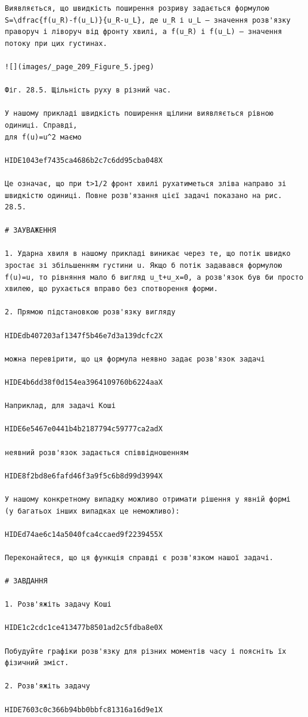 \documentclass[
  ukrainian,
]{article}
\begin{document}
\begin{verbatim}
Виявляється, що швидкість поширення розриву задається формулою
S=\dfrac{f(u_R)-f(u_L)}{u_R-u_L}, де u_R і u_L — значення розв'язку праворуч і ліворуч від фронту хвилі, а f(u_R) і f(u_L) — значення потоку при цих густинах.

![](images/_page_209_Figure_5.jpeg)

Фіг. 28.5. Щільність руху в різний час.

У нашому прикладі швидкість поширення щілини виявляється рівною одиниці. Справді,
для f(u)=u^2 маємо

HIDE1043ef7435ca4686b2c7c6dd95cba048X

Це означає, що при t>1/2 фронт хвилі рухатиметься зліва направо зі швидкістю одиниці. Повне розв'язання цієї задачі показано на рис. 28.5.

# ЗАУВАЖЕННЯ

1. Ударна хвиля в нашому прикладі виникає через те, що потік швидко зростає зі збільшенням густини u. Якщо б потік задавався формулою f(u)=u, то рівняння мало б вигляд u_t+u_x=0, а розв'язок був би просто хвилею, що рухається вправо без спотворення форми.

2. Прямою підстановкою розв'язку вигляду

HIDEdb407203af1347f5b46e7d3a139dcfc2X

можна перевірити, що ця формула неявно задає розв'язок задачі

HIDE4b6dd38f0d154ea3964109760b6224aaX

Наприклад, для задачі Коші

HIDE6e5467e0441b4b2187794c59777ca2adX

неявний розв'язок задається співвідношенням

HIDE8f2bd8e6fafd46f3a9f5c6b8d99d3994X

У нашому конкретному випадку можливо отримати рішення у явній формі
(у багатьох інших випадках це неможливо):

HIDEd74ae6c14a5040fca4ccaed9f2239455X

Переконайтеся, що ця функція справді є розв'язком нашої задачі.

# ЗАВДАННЯ

1. Розв'яжіть задачу Коші

HIDE1c2cdc1ce413477b8501ad2c5fdba8e0X

Побудуйте графіки розв'язку для різних моментів часу і поясніть їх фізичний зміст.

2. Розв'яжіть задачу

HIDE7603c0c366b94bb0bbfc81316a16d9e1X


\end{verbatim}
\end{document}
